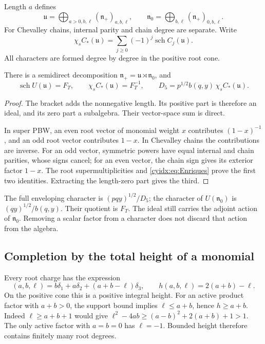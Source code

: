 Length \(a\) defines
\[
 \mathfrak u=\bigoplus_{a>0,b,\ell}(\mathfrak n_+)_{a,b,\ell},
 \qquad
 \mathfrak n_0=\bigoplus_{b,\ell}(\mathfrak n_+)_{0,b,\ell}.
\]
For Chevalley chains, internal parity and chain degree
are separate. Write
\[
 \chi_s C_*(\mathfrak u)
       =\sum_{j\geq0}(-1)^j\operatorname{sch}C_j(\mathfrak u).
\]
All characters are formed degree by degree in the positive
root cone.

\begin{proposition}\label{cyidx:prop:PBW}
There is a semidirect decomposition
\(\mathfrak n_+=\mathfrak u\rtimes\mathfrak n_0\), and
\begin{equation}\label{cyidx:eq:PBW}
 \operatorname{sch}U(\mathfrak u)=F_T,\qquad
 \chi_s C_*(\mathfrak u)=F_T^{-1},\qquad
 D_5=p^{1/2}b(q,y)\,\chi_s C_*(\mathfrak u).
\end{equation}
\end{proposition}
\begin{proof}
The bracket adds the nonnegative length. Its positive
part is therefore an ideal, and its zero part a subalgebra.
Their vector-space sum is direct.

In super PBW, an even root vector of monomial weight \(x\)
contributes \((1-x)^{-1}\), and an odd root vector contributes
\(1-x\). In Chevalley chains the contributions are inverse.
For an odd vector, symmetric powers have equal internal
and chain parities, whose signs cancel; for an even vector,
the chain sign gives its exterior factor \(1-x\).
The root supermultiplicities and
\eqref{cyidx:eq:Enriques} prove the first two identities.
Extracting the length-zero part gives the third.
\end{proof}

The full enveloping character is \((pqy)^{1/2}/D_5\);
the character of \(U(\mathfrak n_0)\) is
\((qy)^{1/2}/b(q,y)\). Their quotient is \(F_T\).
The ideal still carries the adjoint action of
\(\mathfrak n_0\). Removing a scalar factor from a character
does not discard that action from the algebra.

\subsection{Completion by the total height of a monomial}

Every root charge has the expression
\begin{equation}\label{cyidx:eq:height}
 (a,b,\ell)=b\delta_1+a\delta_2+(a+b-\ell)\delta_3,
 \qquad h(a,b,\ell)=2(a+b)-\ell.
\end{equation}
On the positive cone this is a positive integral height.
For an active product factor with \(a+b>0\), the support
bound implies \(\ell\leq a+b\), hence \(h\geq a+b\).
Indeed \(\ell\geq a+b+1\) would give
\(\ell^2-4ab\geq(a-b)^2+2(a+b)+1>1\).
The only active factor with \(a=b=0\) has \(\ell=-1\).
Bounded height therefore contains finitely many root degrees.

